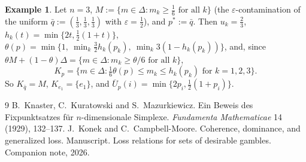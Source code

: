 \documentclass[11pt]{article}
\theoremstyle{definition}
\newtheorem{example}[theorem]{Example}
\newcommand{\Ub}{\overline U}
\begin{document}
\begin{example}\label{ex:n3}
Let $n=3$, $M:=\{m\in\Delta:m_k\ge\frac16\text{ for all }k\}$ (the $\varepsilon$-contamination of the uniform $\bar q:=(\frac13,\frac13,\frac13)$ with $\varepsilon=\frac12$), and $p^*:=\bar q$. Then $u_k=\frac23$, $h_k(t)=\min\{2t,\frac12(1+t)\}$, $\theta(p)=\min\{1,\ \min_k\frac32h_k(p_k),\ \min_k3(1-h_k(p_k))\}$, and, since $\theta M+(1-\theta)\Delta=\{m\in\Delta:m_k\ge\theta/6\text{ for all }k\}$,
\[
K_p=\Big\{m\in\Delta:\tfrac16\theta(p)\le m_k\le h_k(p_k)\text{ for }k=1,2,3\Big\}.
\]
So $K_{\bar q}=M$, $K_{e_1}=\{e_1\}$, and $\Ub_p(i)=\min\{2p_i,\frac12(1+p_i)\}$.
\end{example}

\begin{thebibliography}{9}
 B.~Knaster, C.~Kuratowski and S.~Mazurkiewicz. Ein Beweis des Fixpunktsatzes f\"ur $n$-dimensionale Simplexe. \emph{Fundamenta Mathematicae} 14 (1929), 132--137.
 J.~Konek and C.~Campbell-Moore. Coherence, dominance, and generalized loss. Manuscript.
 Loss relations for sets of desirable gambles. Companion note, 2026.
\end{thebibliography}
\end{document}
